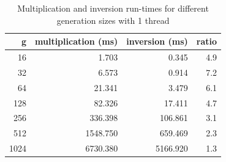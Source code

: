 \begin{table}[H]
\center
\caption{Multiplication and inversion run-times for different generation sizes with 1 thread}
\begin{tabular}{|r|r|r|r|}
\hline
g & multiplication (ms) & inversion (ms) & ratio \\
\hline
\hline

	16 & 1.703  & 0.345 & 4.9 \\
\hline
	32 & 6.573  & 0.914 & 7.2 \\
\hline
	64 & 21.341  & 3.479 & 6.1 \\
\hline
	128 & 82.326  & 17.411 & 4.7 \\
\hline
	256 & 336.398  & 106.861 & 3.1 \\
\hline
	512 & 1548.750  & 659.469 & 2.3 \\
\hline
	1024 & 6730.380  & 5166.920 & 1.3 \\
\hline
\end{tabular}
\vspace{0.2cm}
\label{runtimes}
\end{table}
